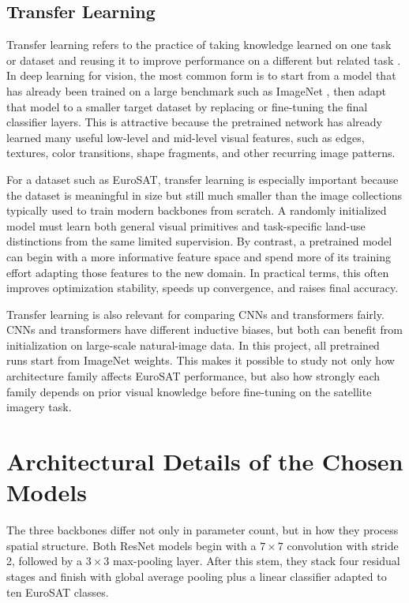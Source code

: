 \documentclass[11pt]{report}
\begin{document}
\subsection{Transfer Learning}
Transfer learning refers to the practice of taking knowledge learned on one task or dataset and reusing it to improve performance on a different but related task \cite{pan2010}. In deep learning for vision, the most common form is to start from a model that has already been trained on a large benchmark such as ImageNet \cite{deng2009}, then adapt that model to a smaller target dataset by replacing or fine-tuning the final classifier layers. This is attractive because the pretrained network has already learned many useful low-level and mid-level visual features, such as edges, textures, color transitions, shape fragments, and other recurring image patterns.

For a dataset such as EuroSAT, transfer learning is especially important because the dataset is meaningful in size but still much smaller than the image collections typically used to train modern backbones from scratch. A randomly initialized model must learn both general visual primitives and task-specific land-use distinctions from the same limited supervision. By contrast, a pretrained model can begin with a more informative feature space and spend more of its training effort adapting those features to the new domain. In practical terms, this often improves optimization stability, speeds up convergence, and raises final accuracy.

Transfer learning is also relevant for comparing CNNs and transformers fairly. CNNs and transformers have different inductive biases, but both can benefit from initialization on large-scale natural-image data. In this project, all pretrained runs start from ImageNet weights. This makes it possible to study not only how architecture family affects EuroSAT performance, but also how strongly each family depends on prior visual knowledge before fine-tuning on the satellite imagery task.

\section{Architectural Details of the Chosen Models}
The three backbones differ not only in parameter count, but in how they process spatial structure. Both ResNet models begin with a \(7 \times 7\) convolution with stride 2, followed by a \(3 \times 3\) max-pooling layer. After this stem, they stack four residual stages and finish with global average pooling plus a linear classifier adapted to ten EuroSAT classes.
\end{document}
